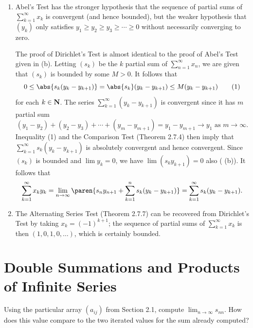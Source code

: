 \documentclass{lew98_solutions}
\begin{document}
\begin{solution}
    \begin{enumerate}
        \item Abel's Test has the stronger hypothesis that the sequence of partial sums of \( \sum_{k=1}^{\infty} x_k \) is convergent (and hence bounded), but the weaker hypothesis that \( (y_k) \) only satisfies \( y_1 \geq y_2 \geq y_3 \geq \cdots \geq 0 \) without necessarily converging to zero.

        The proof of Dirichlet's Test is almost identical to the proof of Abel's Test given in  (b). Letting \( (s_k) \) be the \( k \) partial sum of \( \sum_{n=1}^{\infty} x_n \), we are given that \( (s_k) \) is bounded by some \( M > 0 \). It follows that
        \[
            0 \leq \abs{s_k (y_k - y_{k+1})} = \abs{s_k} (y_k - y_{k+1}) \leq M (y_k - y_{k+1}) \tag{1}
        \]
        for each \( k \in \mathbf{N} \). The series \( \sum_{k=1}^{\infty} (y_k - y_{k+1}) \) is convergent since it has \( m \) partial sum
        \[
            (y_1 - y_2) + (y_2 - y_3) + \cdots + (y_m - y_{m+1}) = y_1 - y_{m+1} \to y_1 \text{ as } m \to \infty.
        \]
        Inequality (1) and the Comparison Test (Theorem 2.7.4) then imply that \( \sum_{k=1}^{\infty} s_k(y_k - y_{k+1}) \) is absolutely convergent and hence convergent. Since \( (s_k) \) is bounded and \( \lim y_k = 0 \), we have \( \lim (s_k y_{k+1}) = 0 \) also ( (b)). It follows that
        \[
            \sum_{k=1}^{\infty} x_k y_k = \lim_{n \to \infty} \paren{ s_n y_{n+1} + \sum_{k=1}^n s_k (y_k - y_{k+1}) } = \sum_{k=1}^{\infty} s_k (y_k - y_{k+1}).
        \]

        \item The Alternating Series Test (Theorem 2.7.7) can be recovered from Dirichlet's Test by taking \( x_k = (-1)^{k+1} \); the sequence of partial sums of \( \sum_{k=1}^{\infty} x_k \) is then \( (1, 0, 1, 0, \ldots) \), which is certainly bounded.
    \end{enumerate}
\end{solution}

\section{Double Summations and Products of Infinite Series}
\label{sec:2.8}

\begin{exercise}
\label{ex:2.8.1}
    Using the particular array \( (a_{ij}) \) from Section 2.1, compute \( \lim_{n \to \infty} s_{nn} \). How does this value compare to the two iterated values for the sum already computed?
\end{exercise}
\end{document}

